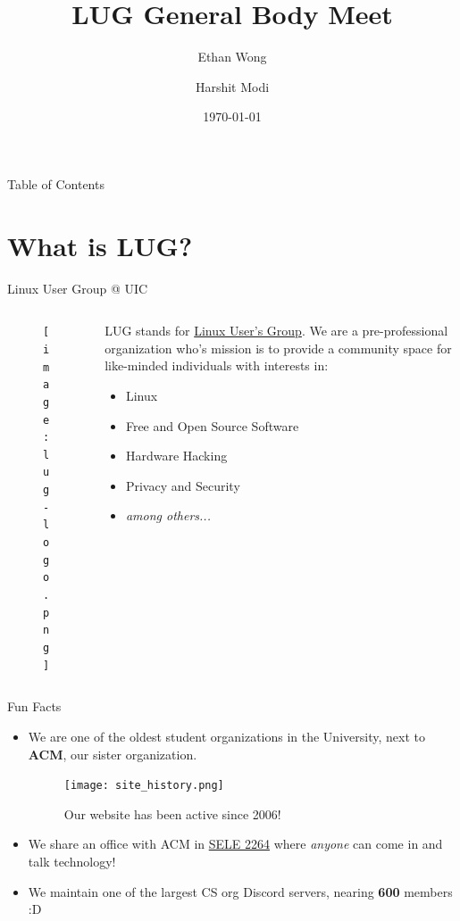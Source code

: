 \documentclass{beamer}
\title{LUG General Body Meet}
\author{Ethan Wong \and Harshit Modi}
\date{\today}
\institute{Linux Users Group @ UIC}
\begin{document}
\begin{frame}
	\titlepage
\end{frame}

\begin{frame}{Table of Contents}
	\tableofcontents[pausesections]
\end{frame}

\section{What is LUG?}
\begin{frame}{Linux User Group @ UIC}
	\begin{columns}
		\begin{column}{0.5\textwidth}
			\begin{figure}
				\centering
				\texttt{[image: lug-logo.png]}
			\end{figure}
		\end{column}
		\begin{column}{0.5\textwidth}
			LUG stands for \underline{Linux User's Group}.
			\pause We are a pre-professional organization who's mission is to
			provide a community space for like-minded individuals with interests
			in:
			\begin{itemize}
				\item Linux
				\item Free and Open Source Software
				\item Hardware Hacking
				\item Privacy and Security
				\item \textit{among others...}
			\end{itemize}
		\end{column}
	\end{columns}
\end{frame}

\begin{frame}{Fun Facts}
	\begin{itemize}
		\item We are one of the oldest student organizations in the University,
		      next to \textbf{ACM}, our sister organization.
		      \pause
		      \begin{figure}
			      \centering
			      \texttt{[image: site\_history.png]}
			      \caption{Our website has been active since 2006!}
		      \end{figure}
		      \pause
		\item We share an office with ACM in \underline{SELE 2264}
		      where \textit{anyone} can come in and talk technology!
		      \pause
		\item We maintain one of the largest CS org Discord servers,
			nearing \textbf{600} members :D
	\end{itemize}
\end{frame}
\end{document}
